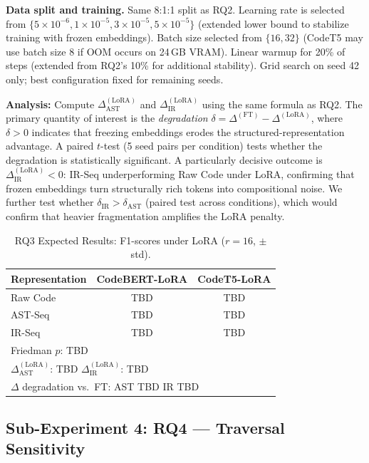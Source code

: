 \documentclass[pdflatex,sn-mathphys,Numbered]{sn-jnl}
\newcommand{\RQThreeRawF}{TBD}      %
\newcommand{\RQThreeASTF}{TBD}      %
\newcommand{\RQThreeIRF}{TBD}       %
\newcommand{\RQThreePval}{TBD}      %
\newcommand{\RQThreeDeltaAST}{TBD}  %
\newcommand{\RQThreeDeltaIR}{TBD}   %
\newcommand{\RQThreeLossAST}{TBD}   %
\newcommand{\RQThreeLossIR}{TBD}    %
\begin{document}
\textbf{Data split and training.} Same 8:1:1 split as RQ2. Learning rate is selected from $\{5\times 10^{-6}, 1\times 10^{-5}, 3\times 10^{-5}, 5\times 10^{-5}\}$ (extended lower bound to stabilize training with frozen embeddings). Batch size selected from $\{16, 32\}$ (CodeT5 may use batch size 8 if OOM occurs on 24\,GB VRAM). Linear warmup for 20\% of steps (extended from RQ2's 10\% for additional stability). Grid search on seed 42 only; best configuration fixed for remaining seeds.

\textbf{Analysis:} Compute $\Delta_{\text{AST}}^{(\text{LoRA})}$ and $\Delta_{\text{IR}}^{(\text{LoRA})}$ using the same formula as RQ2. The primary quantity of interest is the \emph{degradation} $\delta = \Delta^{(\text{FT})} - \Delta^{(\text{LoRA})}$, where $\delta > 0$ indicates that freezing embeddings erodes the structured-representation advantage. A paired $t$-test (5 seed pairs per condition) tests whether the degradation is statistically significant. A particularly decisive outcome is $\Delta_{\text{IR}}^{(\text{LoRA})} < 0$: IR-Seq underperforming Raw Code under LoRA, confirming that frozen embeddings turn structurally rich tokens into compositional noise. We further test whether $\delta_{\text{IR}} > \delta_{\text{AST}}$ (paired test across conditions), which would confirm that heavier fragmentation amplifies the LoRA penalty.

\begin{table}[tb]
\centering
\caption{RQ3 Expected Results: F1-scores under LoRA ($r=16$, $\pm$ std).}\label{tab:rq3}
\begin{tabular}{lcc}
\toprule
Representation & CodeBERT-LoRA & CodeT5-LoRA \\
\midrule
Raw Code  & \RQThreeRawF{} & \RQThreeRawF{} \\
AST-Seq   & \RQThreeASTF{} & \RQThreeASTF{} \\
IR-Seq    & \RQThreeIRF{}  & \RQThreeIRF{} \\
\midrule
\multicolumn{3}{l}{Friedman $p$: \RQThreePval{}} \\
\multicolumn{3}{l}{$\Delta_{\text{AST}}^{(\text{LoRA})}$: \RQThreeDeltaAST{} \quad $\Delta_{\text{IR}}^{(\text{LoRA})}$: \RQThreeDeltaIR{}} \\
\multicolumn{3}{l}{$\Delta$ degradation vs.\ FT: AST \RQThreeLossAST{} \quad IR \RQThreeLossIR{}} \\
\bottomrule
\end{tabular}
\end{table}

\subsection{Sub-Experiment 4: RQ4 --- Traversal Sensitivity}
\end{document}
